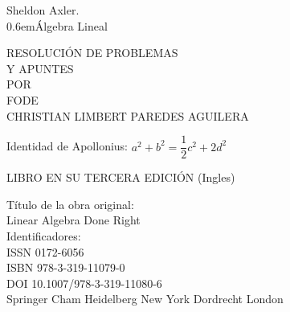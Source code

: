 \begin{titlingpage}

\newcommand\nbvspace[1][3]{\vspace*{\stretch{#1}}}
\newcommand\nbstretchyspace{\spaceskip0.5em plus 0.25em minus 0.25em}
\newcommand{\nbtitlestretch}{\spaceskip0.6em}
\pagestyle{empty}

\begin{center}
\bfseries
\nbvspace[1]

\Large Sheldon Axler.\\
\Huge
{\nbtitlestretch\Huge Álgebra Lineal}\\
\vspace{.5cm}
\large
\nbvspace[1]

RESOLUCIÓN DE PROBLEMAS\\
Y APUNTES\\

\nbvspace[1]
\small POR\\
\Large FODE\\[0.5em]
\footnotesize CHRISTIAN LIMBERT PAREDES AGUILERA\\

\nbvspace[2]

Identidad de Apollonius: $a^2+b^2=\dfrac{1}{2}c^2+2d^2$

\begin{center}
\end{center}

\nbvspace[3]
\normalsize

LIBRO EN SU TERCERA EDICIÓN (Ingles)\\
\large
\nbvspace[1]

\end{center}

\break
\bfseries 

\nbvspace[1]
Título de la obra original:\\
Linear Algebra Done Right\\
Identificadores: \\
ISSN 0172-6056\\
ISBN 978-3-319-11079-0\\
DOI 10.1007/978-3-319-11080-6\\
Springer Cham Heidelberg New York Dordrecht London\\



\end{titlingpage}
